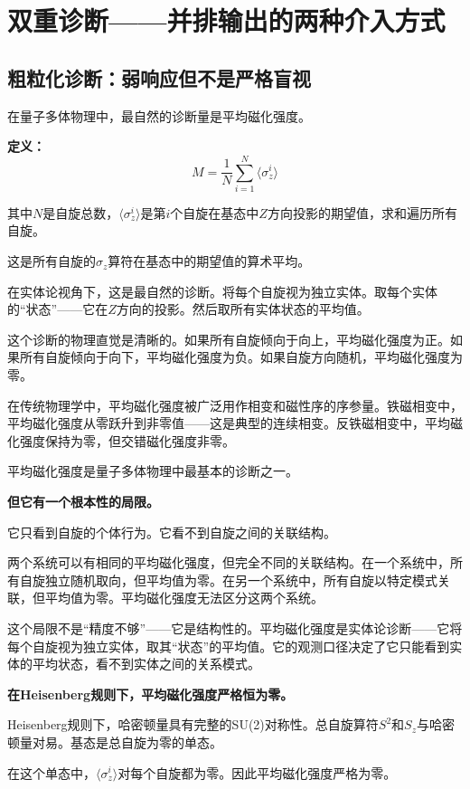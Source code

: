 \documentclass[11pt,a4paper]{book}
\theoremstyle{definition}
\begin{document}
\chapter{双重诊断——并排输出的两种介入方式}

\section{粗粒化诊断：弱响应但不是严格盲视}

在量子多体物理中，最自然的诊断量是平均磁化强度。

\textbf{定义：}
\begin{equation}
M = \frac{1}{N} \sum_{i=1}^{N} \langle \sigma_z^i \rangle
\end{equation}

其中$N$是自旋总数，$\langle\sigma_z^i\rangle$是第$i$个自旋在基态中$Z$方向投影的期望值，求和遍历所有自旋。

这是所有自旋的$\sigma_z$算符在基态中的期望值的算术平均。

在实体论视角下，这是最自然的诊断。将每个自旋视为独立实体。取每个实体的“状态”——它在$Z$方向的投影。然后取所有实体状态的平均值。

这个诊断的物理直觉是清晰的。如果所有自旋倾向于向上，平均磁化强度为正。如果所有自旋倾向于向下，平均磁化强度为负。如果自旋方向随机，平均磁化强度为零。

在传统物理学中，平均磁化强度被广泛用作相变和磁性序的序参量。铁磁相变中，平均磁化强度从零跃升到非零值——这是典型的连续相变。反铁磁相变中，平均磁化强度保持为零，但交错磁化强度非零。

平均磁化强度是量子多体物理中最基本的诊断之一。

\textbf{但它有一个根本性的局限。}

它只看到自旋的个体行为。它看不到自旋之间的关联结构。

两个系统可以有相同的平均磁化强度，但完全不同的关联结构。在一个系统中，所有自旋独立随机取向，但平均值为零。在另一个系统中，所有自旋以特定模式关联，但平均值为零。平均磁化强度无法区分这两个系统。

这个局限不是“精度不够”——它是结构性的。平均磁化强度是实体论诊断——它将每个自旋视为独立实体，取其“状态”的平均值。它的观测口径决定了它只能看到实体的平均状态，看不到实体之间的关系模式。

\textbf{在Heisenberg规则下，平均磁化强度严格恒为零。}

Heisenberg规则下，哈密顿量具有完整的SU(2)对称性。总自旋算符$S^2$和$S_z$与哈密顿量对易。基态是总自旋为零的单态。

在这个单态中，$\langle\sigma_z^i\rangle$对每个自旋都为零。因此平均磁化强度严格为零。
\end{document}
